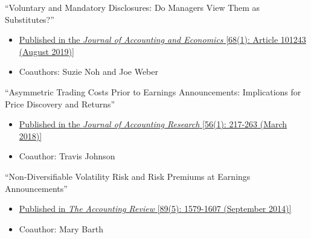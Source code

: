 \pagebreak[0]
\begin{samepage}
\item ``Voluntary and Mandatory Disclosures: Do Managers View Them as Substitutes?''
\begin{itemize}
\vspace*{-.07in}
	\item \href{https://doi.org/10.1016/j.jacceco.2019.101243}{Published in the {\it Journal of Accounting and Economics} [68(1): Article 101243 (August 2019)]}
	\vspace*{-.07in}
	\item Coauthors: Suzie Noh and Joe Weber
\end{itemize}
\end{samepage}

\vskip 0.08cm


\pagebreak[0]
\begin{samepage}
\item ``Asymmetric Trading Costs Prior to Earnings Announcements: Implications for Price Discovery and Returns''
\begin{itemize}
\vspace*{-.07in}
	\item \href{https://doi.org/10.1111/1475-679X.12189}{Published in the {\it Journal of Accounting Research} [56(1): 217-263 (March 2018)]}
\vspace*{-.07in}
	\item Coauthor: Travis Johnson
\end{itemize}
\end{samepage}

\vskip 0.08cm
\pagebreak[0]
\begin{samepage}
\item ``Non-Diversifiable Volatility Risk and Risk Premiums at Earnings Announcements''
\begin{itemize}
\vspace*{-.07in}
	\item \href{https://doi.org/10.2308/accr-50758}{Published in {\it The Accounting Review} [89(5): 1579-1607 (September 2014)]}
\vspace*{-.07in}
	\item Coauthor: Mary Barth
\end{itemize}
\end{samepage}

\vskip 0.08cm

